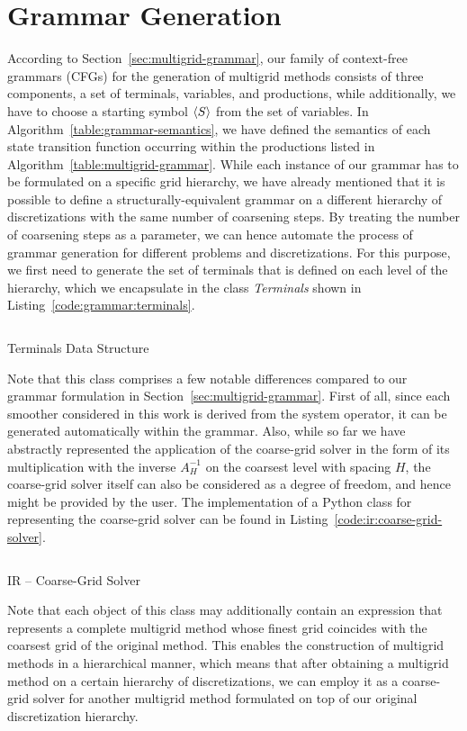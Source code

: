\section{Grammar Generation}
According to Section~\ref{sec:multigrid-grammar}, our family of context-free grammars (CFGs) for the generation of multigrid methods consists of three components, a set of terminals, variables, and productions, while additionally, we have to choose a starting symbol $\langle S \rangle$ from the set of variables.
In Algorithm~\ref{table:grammar-semantics}, we have defined the semantics of each state transition function occurring within the productions listed in Algorithm~\ref{table:multigrid-grammar}.
While each instance of our grammar has to be formulated on a specific grid hierarchy, we have already mentioned that it is possible to define a structurally-equivalent grammar on a different hierarchy of discretizations with the same number of coarsening steps.
By treating the number of coarsening steps as a parameter, we can hence automate the process of grammar generation for different problems and discretizations.
For this purpose, we first need to generate the set of terminals that is defined on each level of the hierarchy, which we encapsulate in the class \emph{Terminals} shown in Listing~\ref{code:grammar:terminals}.
\begin{listing}
	\inputminted{python}{evostencils/grammar/terminals.py}
	\caption{Terminals Data Structure}
	\label{code:grammar:terminals}
\end{listing}
Note that this class comprises a few notable differences compared to our grammar formulation in Section~\ref{sec:multigrid-grammar}.
First of all, since each smoother considered in this work is derived from the system operator, it can be generated automatically within the grammar.
Also, while so far we have abstractly represented the application of the coarse-grid solver in the form of its multiplication with the inverse $A^{-1}_H$ on the coarsest level with spacing $H$, the coarse-grid solver itself can also be considered as a degree of freedom, and hence might be provided by the user.
The implementation of a Python class for representing the coarse-grid solver can be found in Listing~\ref{code:ir:coarse-grid-solver}.
\begin{listing}
	\inputminted{python}{evostencils/ir/coarse_grid_solver.py}
	\caption{IR -- Coarse-Grid Solver}
	\label{code:ir:coarse-grid-solver}
\end{listing}
Note that each object of this class may additionally contain an expression that represents a complete multigrid method whose finest grid coincides with the coarsest grid of the original method.
This enables the construction of multigrid methods in a hierarchical manner, which means that after obtaining a multigrid method on a certain hierarchy of discretizations, we can employ it as a coarse-grid solver for another multigrid method formulated on top of our original discretization hierarchy.

